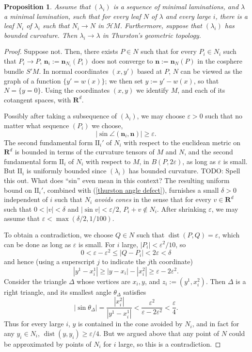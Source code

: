 \documentclass[reqno,11pt]{amsart}
\newcommand{\RR}{\mathbf{R}}
\DeclareMathOperator{\dist}{dist}
\newcommand{\Hypspace}{\mathscr H}
\newcommand{\Two}{\mathrm{I\!I}}
\newcommand{\normal}{\mathbf n}
\newcommand{\dfn}[1]{\emph{#1}\index{#1}}
\newtheorem{proposition}[theorem]{Proposition}
\theoremstyle{definition}
\numberwithin{equation}{section}
\begin{document}
\begin{proposition}\label{convergence of geodesic lams in thurston}
Assume that $(\lambda_i)$ is a sequence of minimal laminations, and $\lambda$ a minimal lamination, such that for every leaf $N$ of $\lambda$ and every large $i$, there is a leaf $N_i$ of $\lambda_i$ such that $N_i \to N$ in $\Hypspace M$.
Furthermore, suppose that $(\lambda_i)$ has bounded curvature.
Then $\lambda_i \to \lambda$ in Thurston's geometric topology.
\end{proposition}
\begin{proof}
Suppose not. Then, there exists $P \in N$ such that for every $P_i \in N_i$ such that $P_i \to P$, $\normal_i := \normal_{N_i}(P_i)$ does not converge to $\normal := \normal_N(P)$ in the cosphere bundle $S'M$.
In normal coordinates $(x, y')$ based at $P$, $N$ can be viewed as the graph of a function $\{y' = w(x)\}$; we then set $y := y' - w(x)$, so that $N = \{y = 0\}$.
Using the coordinates $(x, y)$ we identify $M$, and each of its cotangent spaces, with $\RR^d$.

Possibly after taking a subsequence of $(\lambda_i)$, we may choose $\varepsilon > 0$ such that no matter what sequence $(P_i)$ we choose,
\begin{equation}\label{thurston angle defect}
	|\sin \angle(\normal_i, \normal)| \geq \varepsilon.
\end{equation}
The second fundamental form $\Two_i'$ of $N_i$ with respect to the euclidean metric on $\RR^d$ is bounded in terms of the curvature tensors of $M$ and $N$, and the second fundamental form $\Two_i$ of $N_i$ with respect to $M$, in $B(P, 2\varepsilon)$, as long as $\varepsilon$ is small.
But $\Two_i$ is uniformly bounded since $(\lambda_i)$ has bounded curvature. TODO: Spell this out. What does ``sin'' even mean in this context?
The resulting uniform bound on $\Two_i'$, combined with (\ref{thurston angle defect}), furnishes a small $\delta > 0$ independent of $i$ such that $N_i$ \dfn{avoids cones} in the sense that for every $v \in \RR^d$ such that $0 < |v| < \delta$ and $|\sin v| < \varepsilon/2$, $P_i + v \notin N_i$.
After shrinking $\varepsilon$, we may assume that $\varepsilon < \max(\delta/2, 1/100)$.

To obtain a contradiction, we choose $Q \in N$ such that $\dist(P, Q) = \varepsilon$, which can be done as long as $\varepsilon$ is small.
For $i$ large, $|P_i| < \varepsilon^2/10$, so
$$0 < \varepsilon - \varepsilon^2 \leq |Q - P_i| < 2\varepsilon < \delta$$
and hence (using a superscript $j$ to indicate the $j$th coordinate)
$$|y^1 - x_i^1| \geq |y - x_i| - |x_i^2| \geq \varepsilon - 2\varepsilon^2.$$
Consider the triangle $\Delta$ whose vertices are $x_i, y$, and $z_i := (y^1, x_i^2)$.
Then $\Delta$ is a right triangle, and its smallest angle $\theta_\Delta$ satisfies
$$|\sin \theta_\Delta| = \frac{|x_i^2|}{|y^1 - x_i^1|} < \frac{\varepsilon^2}{\varepsilon - 2\varepsilon^2} < \frac{\varepsilon}{4}.$$
Thus for every large $i$, $y$ is contained in the cone avoided by $N_i$, and in fact for any $y_i \in N_i$, $\dist(y, y_i) \geq \varepsilon/4$.
But we argued above that any point of $N$ could be approximated by points of $N_i$ for $i$ large, so this is a contradiction.
\end{proof}
\end{document}
